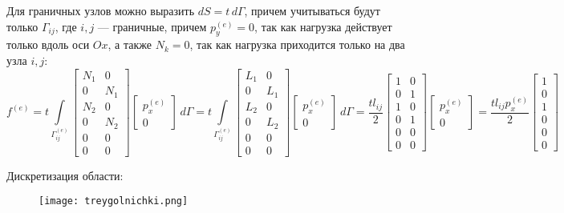 \documentclass[a4paper, 12pt]{article}
\begin{document}
Для граничных узлов можно выразить \(dS = t \, d\Gamma\), причем учитываться будут только \(\Gamma_{ij}\), где \(i,j\) — граничные, причем \(p_y^{(e)} = 0\), так как нагрузка действует только вдоль оси \(Ox\), а также \(N_k = 0\), так как нагрузка приходится только на два узла \(i,j\):
\[
f^{(e)} = t \int\limits_{\Gamma_{ij}^{(e)}} \begin{bmatrix}
	N_1 & 0 \\ 0 & N_1 \\
	N_2 & 0 \\ 0 & N_2 \\
	0 & 0 \\ 0 & 0 
\end{bmatrix}
\begin{bmatrix}
	p_x^{(e)} \\ 0
\end{bmatrix}
\, d\Gamma = t \int\limits_{\Gamma_{ij}^{(e)}}
\begin{bmatrix}
	L_1 & 0 \\ 0 & L_1 \\
	L_2 & 0 \\ 0 & L_2 \\
	0 & 0 \\ 0 & 0 
\end{bmatrix}
\begin{bmatrix}
	p_x^{(e)} \\ 0
\end{bmatrix} \, d\Gamma= \frac{tl_{ij}}{2}
\begin{bmatrix}
	1 & 0 \\ 0 & 1 \\
	1 & 0 \\ 0 & 1 \\
	0 & 0 \\ 0 & 0 
\end{bmatrix} \begin{bmatrix}
p_x^{(e)} \\ 0
\end{bmatrix} = \frac{tl_{ij} p_x^{(e)}}{2} \begin{bmatrix}
1\\0\\1\\0\\0\\0
\end{bmatrix}
\]

Дискретизация области:
\begin{figure}[h]
	\centering
	\texttt{[image: treygolnichki.png]}
\end{figure} 
\end{document}
